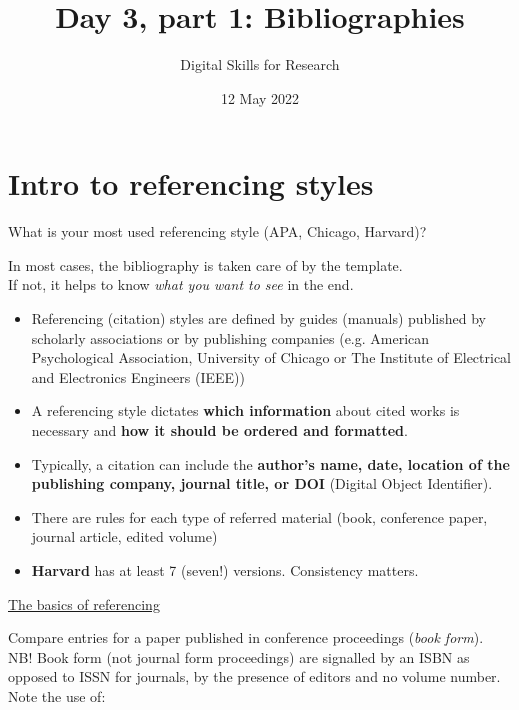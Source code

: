\documentclass[a4paper,11pt]{article}
\title{Day 3, part 1: Bibliographies}
\author{Digital Skills for Research}
\date{12 May 2022}
\begin{document}
	
\clearpage
\maketitle
\thispagestyle{empty}

\tableofcontents

\section{Intro to referencing styles}

\begin{tcolorbox}[colback=red!5!white, colframe=red!75!black]
	\centering
	{\Large{What is your most used referencing style (APA, Chicago, Harvard)?}}
\end{tcolorbox}
\bigskip
In most cases, the bibliography is taken care of by the template. \\
If not, it helps to know \emph{what you want to see} in the end. 
\bigskip

\begin{itemize}
	\item Referencing (citation) styles are defined by guides (manuals) published by scholarly associations or by publishing companies (e.g. American Psychological Association, University of Chicago or The Institute of Electrical and Electronics Engineers (IEEE))
	\item A referencing style dictates \textbf{which information} about cited works is necessary and \textbf{how it should be ordered and formatted}.
	\item Typically, a citation can include the \textbf{author's name, date, location of the publishing company, journal title, or DOI} (Digital Object Identifier).
	\item There are rules for each type of referred material (book, conference paper, journal article, edited volume)
	\item \textbf{Harvard} has at least 7 (seven!) versions. Consistency matters. 
\end{itemize}

\href{https://www.citethemrightonline.com/Basics}{\underline{The basics of referencing}}

\medskip

Compare entries for a paper published in conference proceedings (\emph{book form}).\\
NB! Book form (not journal form proceedings) are signalled by an ISBN as opposed to  ISSN for journals, by the presence of editors and no volume number.\\
\medskip
Note the use of:
\end{document}
